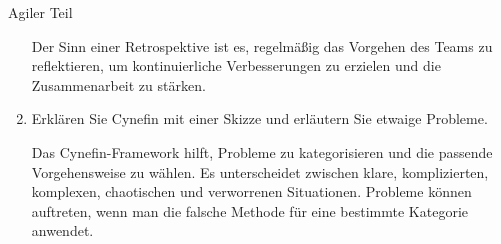 \documentclass{article}
\begin{document}
\begin{exercise}{Agiler Teil}
\begin{enumerate}
          \begin{solution}
            Der Sinn einer Retrospektive ist es, regelmäßig das Vorgehen des Teams zu reflektieren, um kontinuierliche Verbesserungen zu erzielen und die Zusammenarbeit zu stärken.
          \end{solution}

    \item Erklären Sie Cynefin mit einer Skizze und erläutern Sie etwaige Probleme.

          \begin{solution}
            Das Cynefin-Framework hilft, Probleme zu kategorisieren und die passende Vorgehensweise zu wählen. Es unterscheidet zwischen klare, komplizierten, komplexen, chaotischen und verworrenen Situationen. Probleme können auftreten, wenn man die falsche Methode für eine bestimmte Kategorie anwendet.
          \end{solution}

  \end{enumerate}
\end{exercise}
\end{document}
